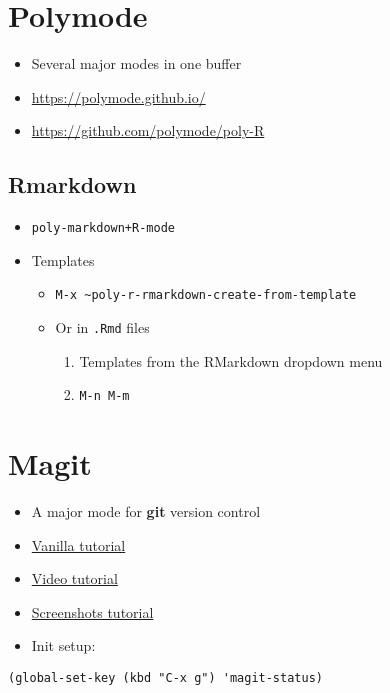 \documentclass[11pt]{article}
\begin{document}
\section{Polymode}
\label{sec:org082716b}

\begin{itemize}
\item Several major modes in one buffer

\item \url{https://polymode.github.io/}

\item \url{https://github.com/polymode/poly-R}
\end{itemize}


\subsection{Rmarkdown}
\label{sec:org5083c68}

\begin{itemize}
\item \texttt{poly-markdown+R-mode}

\item Templates

\begin{itemize}
\item \texttt{M-x \textasciitilde{}poly-r-rmarkdown-create-from-template}

\item Or in \texttt{.Rmd} files

\begin{enumerate}
\item Templates from the RMarkdown dropdown menu

\item \texttt{M-n M-m}
\end{enumerate}
\end{itemize}
\end{itemize}

\section{Magit}
\label{sec:org0eb13b6}

\begin{itemize}
\item A major mode for \textbf{git} version control

\item \href{https://www.masteringemacs.org/article/introduction-magit-emacs-mode-git}{Vanilla tutorial}

\item \href{https://www.youtube.com/watch?v=vQO7F2Q9DwA\&feature=youtu.be}{Video tutorial}

\item \href{https://magit.vc/screenshots/}{Screenshots tutorial}

\item Init setup:
\end{itemize}

\begin{verbatim}
(global-set-key (kbd "C-x g") 'magit-status)
\end{verbatim}
\end{document}
